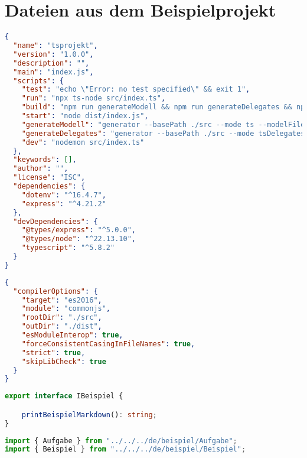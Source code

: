 \documentclass[./einleitung.tex]{subfiles}
\begin{document}
    \section{Dateien aus dem Beispielprojekt}\label{sec:dateien-aus-dem-beispielprojekt}

    \begin{lstlisting}[language=JSON, caption=package.json, label=lst:packageJSON]
{
  "name": "tsprojekt",
  "version": "1.0.0",
  "description": "",
  "main": "index.js",
  "scripts": {
    "test": "echo \"Error: no test specified\" && exit 1",
    "run": "npx ts-node src/index.ts",
    "build": "npm run generateModell && npm run generateDelegates && npx tsc",
    "start": "node dist/index.js",
    "generateModell": "generator --basePath ./src --mode ts --modelFile ../Modell/domain.dmf",
    "generateDelegates": "generator --basePath ./src --mode tsDelegates --modelFile ../Modell/domain.dmf",
    "dev": "nodemon src/index.ts"
  },
  "keywords": [],
  "author": "",
  "license": "ISC",
  "dependencies": {
    "dotenv": "^16.4.7",
    "express": "^4.21.2"
  },
  "devDependencies": {
    "@types/express": "^5.0.0",
    "@types/node": "^22.13.10",
    "typescript": "^5.8.2"
  }
}
    \end{lstlisting}
    \begin{lstlisting}[language=JSON, caption=tsconfig.json (Ohne Kommentare), label=lst:tsconfig]
{
  "compilerOptions": {
    "target": "es2016",
    "module": "commonjs",
    "rootDir": "./src",
    "outDir": "./dist",
    "esModuleInterop": true,
    "forceConsistentCasingInFileNames": true,
    "strict": true,
    "skipLibCheck": true
  }
}
    \end{lstlisting}
    \begin{lstlisting}[language=Typescript, caption=IBeispiel.ts, label=lst:ibeispielTs]
export interface IBeispiel {

    printBeispielMarkdown(): string;
}
    \end{lstlisting}
    \begin{lstlisting}[language=Typescript, caption=AufgabeDelegate.ts, label=lst:aufgabeDelegateTs]
import { Aufgabe } from "../../../de/beispiel/Aufgabe";
import { Beispiel } from "../../../de/beispiel/Beispiel";

    \end{lstlisting}
\end{document}
